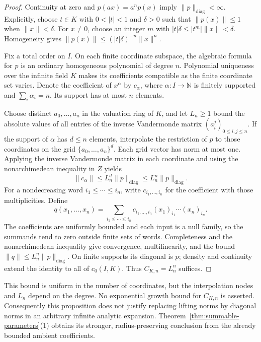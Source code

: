 \documentclass[11pt]{amsart}
\theoremstyle{definition}
\theoremstyle{remark}
\numberwithin{equation}{section}
\newcommand{\N}{\mathbb N}
\newcommand{\abs}[1]{\lvert #1\rvert}
\newcommand{\norm}[1]{\lVert #1\rVert}
\theoremstyle{plain}
\theoremstyle{definition}
\theoremstyle{plain}
\begin{document}
\begin{proof}
Continuity at zero and $p(ax)=a^np(x)$ imply $\norm p_{\mathrm{diag}}<\infty$.
Explicitly, choose $t\in K$ with $0<\abs t<1$ and $\delta>0$ such that $\norm{p(x)}\le1$
when $\norm x<\delta$. For $x\ne0$, choose an integer $m$ with
$\abs t\delta\le\abs{t^m}\norm x<\delta$. Homogeneity gives
$\norm{p(x)}\le(\abs t\delta)^{-n}\norm x^n$.

Fix a total order on $I$. On each finite coordinate subspace, the algebraic formula for $p$ is an
ordinary homogeneous polynomial of degree $n$. Polynomial uniqueness over the infinite field $K$
makes its coefficients compatible as the finite coordinate set varies. Denote the coefficient of
$x^\alpha$ by $c_\alpha$, where $\alpha\colon I\to\N$ is finitely supported and $\sum_i\alpha_i=n$.
Its support has at most $n$ elements.

Choose distinct $a_0,\ldots,a_n$ in the valuation ring of $K$, and let $L_n\ge1$ bound the absolute
values of all entries of the inverse Vandermonde matrix $(a_i^j)_{0\le i,j\le n}$.
If the support of $\alpha$ has $d\le n$ elements, interpolate the restriction of $p$ to those
coordinates on the grid $\{a_0,\ldots,a_n\}^d$. Each grid vector has norm at most one. Applying the
inverse Vandermonde matrix in each coordinate and using the nonarchimedean inequality in $Z$ yields
\[
 \norm{c_\alpha}\le L_n^d\norm p_{\mathrm{diag}}
 \le L_n^n\norm p_{\mathrm{diag}}.
\]
For a nondecreasing word $i_1\le\cdots\le i_n$, write $c_{i_1,\ldots,i_n}$ for the coefficient
with those multiplicities. Define
\[
 q(x_1,\ldots,x_n)=
 \sum_{i_1\le\cdots\le i_n}
 c_{i_1,\ldots,i_n}(x_1)_{i_1}\cdots(x_n)_{i_n}.
\]
The coefficients are uniformly bounded and each input is a null family, so the summands tend to zero
outside finite sets of words. Completeness and the nonarchimedean inequality give convergence,
multilinearity, and the bound $\norm q\le L_n^n\norm p_{\mathrm{diag}}$.
On finite supports its diagonal is $p$; density and continuity extend the identity to all of $c_0(I,K)$.
Thus $C_{K,n}=L_n^n$ suffices.
\end{proof}

This bound is uniform in the number of coordinates, but the interpolation nodes and $L_n$ depend on
the degree. No exponential growth bound for $C_{K,n}$ is asserted. Consequently this proposition does
not justify replacing lifting norms by diagonal norms in an arbitrary infinite analytic expansion.
Theorem~\ref{thm:summable-parameters}(1) obtains its stronger, radius-preserving conclusion from the
already bounded ambient coefficients.
\end{document}
